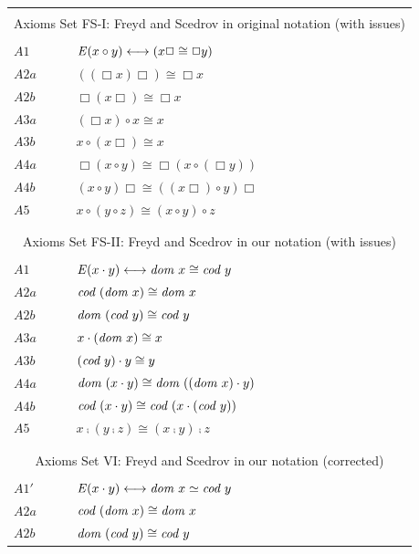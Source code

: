 \begin{table} \centering \normalsize
\begin{tabular}{ll}
\hline
\\
\multicolumn{2}{c}{Axioms Set FS-I:  Freyd and Scedrov in original notation (with issues)} \\
\\
  $A1$ &  $\mathit{E}(x \circ y) \longleftrightarrow (x\Box \cong \Box y)$ \\ 
  $A2a$ & $((\Box x)\Box) \cong \Box x$ \\ 
  $A2b$ & $\Box (x\Box) \cong \Box x$ \\ 
  $A3a$ & $(\Box x) \circ x \cong x$ \\ 
  $A3b$ & $x \circ (x\Box) \cong x$ \\ 
  $A4a$ & $\Box(x \circ y) \cong \Box(x \circ (\Box y))$ \\ 
  $A4b$ & $(x \circ y)\Box \cong ((x\Box) \circ y)\Box$ \\ 
  $A5$   & $x \circ (y \circ z) \cong  (x \circ y) \circ z$ \\
\\
\hline
\\
\multicolumn{2}{c}{Axioms Set FS-II: Freyd and Scedrov in our notation (with issues)} \\
\\
  $A1$  & $\mathit{E} (x \cdot y) \longleftrightarrow \textit{dom \/} x \cong \textit{cod \/} y$ \\
  $A2a$ & $\textit{cod \/}(\textit{dom \/} x) \cong \textit{dom \/} x$ \\  
  $A2b$ & $\textit{dom \/}(\textit{cod \/} y) \cong \textit{cod \/} y$ \\  
  $A3a$  & $x \cdot (\textit{dom \/} x) \cong x$ \\ 
  $A3b$ & $(\textit{cod \/} y) \cdot y \cong y$ \\
  $A4a$ & $\textit{dom \/}(x \cdot y) \cong \textit{dom \/}((\textit{dom \/} x) \cdot y)$ \\ 
  $A4b$ & $\textit{cod \/}(x \cdot y) \cong \textit{cod \/}(x \cdot (\textit{cod \/} y))$ \\ 
  $A5$   & $x \comp (y \comp z) \cong  (x \comp y) \comp z$   \\
\\
\hline
\\
\multicolumn{2}{c}{Axioms Set VI: Freyd and Scedrov in our notation
(corrected)} \\
\\
  $A1'$  & $\mathit{E} (x \cdot y) \longleftrightarrow \textit{dom \/} x \simeq\textit{cod \/} y$ \\
  $A2a$ & $\textit{cod \/}(\textit{dom \/} x) \cong \textit{dom \/} x$ \\  
  $A2b$ & $\textit{dom \/}(\textit{cod \/} y) \cong \textit{cod \/} y$ \\  

\end{tabular}
\end{table}
